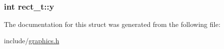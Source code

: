 \subsubsection[{\texorpdfstring{y}{y}}]{\setlength{\rightskip}{0pt plus 5cm}int rect\+\_\+t\+::y}\hypertarget{structrect__t_a0683ba02d080cdcaeacbf0ab28c73083}{}\label{structrect__t_a0683ba02d080cdcaeacbf0ab28c73083}


The documentation for this struct was generated from the following file\+:\begin{DoxyCompactItemize}
\item 
include/\hyperlink{graphics_8h}{graphics.\+h}\end{DoxyCompactItemize}
